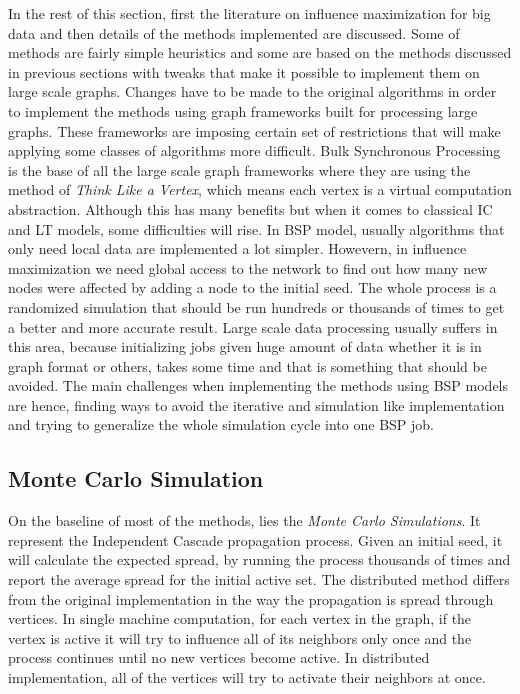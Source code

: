 \documentclass[english]{tktltiki}
\begin{document}
In the rest of this section, first the literature on influence maximization for big data and then details of the methods implemented are discussed. Some of methods are fairly simple heuristics and some are based on the methods discussed in previous sections with tweaks that make it possible to implement them on large scale graphs. 
Changes have to be made to the original algorithms in order to implement the methods using graph frameworks built for processing large graphs. 
These frameworks are imposing certain set of restrictions that will make applying some classes of algorithms more difficult. 
Bulk Synchronous Processing is the base of all the large scale graph frameworks where they are using the method of \textit{Think Like a Vertex}, which means each vertex is a virtual computation abstraction. 
Although this has many benefits but when it comes to classical IC and LT models, some difficulties will rise. 
In BSP model, usually algorithms that only need local data are implemented a lot simpler.
Howevern, in influence maximization we need global access to the network to find out how many new nodes were affected by adding a node to the initial seed. 
The whole process is a randomized simulation that should be run hundreds or thousands of times to get a better and more accurate result. Large scale data processing usually suffers in this area, because initializing jobs given huge amount of data whether it is in graph format or others, takes some time and that is something that should be avoided. 
The main challenges when implementing the methods using BSP models are hence, finding ways to avoid the iterative and simulation like implementation and trying to generalize the whole simulation cycle into one BSP job.

\subsection{Monte Carlo Simulation}
On the baseline of most of the methods, lies the \textit{Monte Carlo Simulations}. 
It represent the Independent Cascade propagation process. 
Given an initial seed, it will calculate the expected spread, by running the process thousands of times and report the average spread for the initial active set. 
The distributed method differs from the original implementation in the way the propagation is spread through vertices. 
In single machine computation, for each vertex in the graph, if the vertex is active it will try to influence all of its neighbors only once and the process continues until no new vertices become active. 
In distributed implementation, all of the vertices will try to activate their neighbors at once. 
\end{document}
